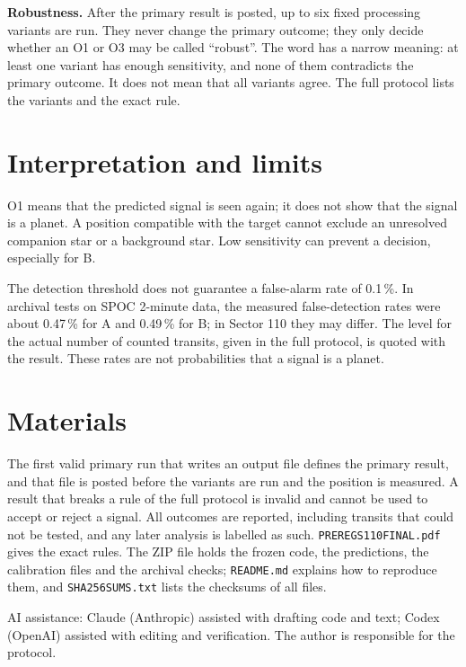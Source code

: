 \documentclass{aastex702}
\newcommand{\code}[1]{\texttt{#1}}
\renewcommand{\_}{\origunderscore\allowbreak}
\newcommand{\runin}[1]{\par\smallskip\noindent\textbf{#1}\enspace}
\begin{document}
\runin{Robustness.} After the primary result is posted, up to six fixed processing variants are run. They never change
the primary outcome; they only decide whether an O1 or O3 may be called ``robust''. The word has a narrow meaning: at least one
variant has enough sensitivity, and none of them contradicts the primary outcome. It does not mean that all variants agree. The full
protocol lists the variants and the exact rule.

\section{Interpretation and limits}

O1 means that the predicted signal is seen again; it does not show that the signal is a planet. A position compatible
with the target cannot exclude an unresolved companion star or a background star. Low sensitivity can prevent a
decision, especially for B.

The detection threshold does not guarantee a false-alarm rate of 0.1\,\%. In archival tests on SPOC 2-minute data,
the measured false-detection rates were about 0.47\,\% for A and 0.49\,\% for B; in Sector 110 they may differ. The level for
the actual number of counted transits, given in the full protocol, is quoted with the result. These rates are not
probabilities that a signal is a planet.

\section{Materials}

The first valid primary run that writes an output file defines the primary result, and that file is posted before the
variants are run and the position is measured. A result that breaks a rule of the full protocol is invalid and cannot
be used to accept or reject a signal. All outcomes are reported, including transits that could not be tested, and any
later analysis is labelled as such. \code{PREREG\_S110\_FINAL.pdf} gives the exact rules. The ZIP file holds the
frozen code, the predictions, the calibration files and the archival checks; \code{README.md} explains how to
reproduce them, and \code{SHA256SUMS.txt} lists the checksums of all files.

\begin{acknowledgments}
AI assistance: Claude (Anthropic) assisted with drafting code and text; Codex (OpenAI) assisted with editing and
verification. The author is responsible for the protocol.
\end{acknowledgments}
\end{document}
